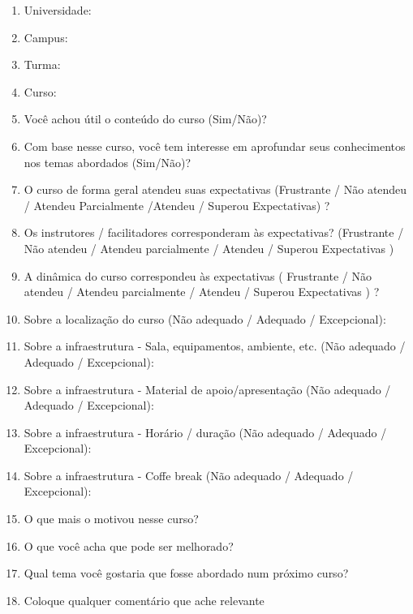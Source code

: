 \begin{anexosenv}
\begin{enumerate}
\item Universidade:
\item Campus:
\item Turma:
\item Curso:
\item Você achou útil o conteúdo do curso (Sim/Não)?
\item Com base nesse curso, você tem interesse em aprofundar seus conhecimentos nos temas abordados (Sim/Não)?
\item O curso de forma geral atendeu suas expectativas (Frustrante / Não atendeu / Atendeu Parcialmente /Atendeu / Superou Expectativas) ?
\item Os instrutores / facilitadores corresponderam às expectativas? (Frustrante / Não atendeu / Atendeu parcialmente / Atendeu / Superou Expectativas )
\item A dinâmica do curso correspondeu às expectativas ( Frustrante / Não atendeu / Atendeu parcialmente / Atendeu / Superou Expectativas ) ? 
\item Sobre a localização do curso (Não adequado / Adequado / Excepcional):
\item Sobre a infraestrutura - Sala, equipamentos, ambiente, etc. (Não adequado / Adequado / Excepcional):
\item Sobre a infraestrutura - Material de apoio/apresentação (Não adequado / Adequado / Excepcional):
\item Sobre a infraestrutura - Horário / duração
(Não adequado / Adequado / Excepcional):
\item Sobre a infraestrutura - Coffe break
(Não adequado / Adequado / Excepcional):
\item O que mais o motivou nesse curso?
\item O que você acha que pode ser melhorado?
\item Qual tema você gostaria que fosse abordado num próximo curso?
\item Coloque qualquer comentário que ache relevante
\end{enumerate}

\end{anexosenv}